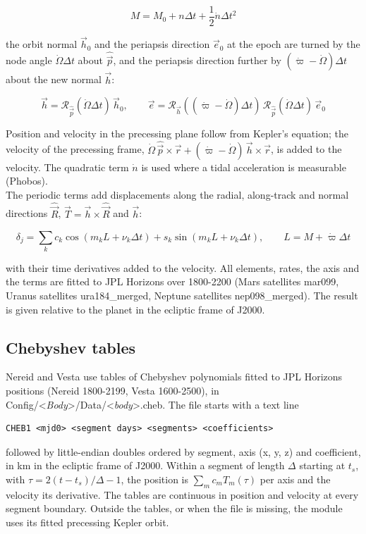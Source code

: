 \documentclass[Orbiter Technical Reference.tex]{subfiles}
\begin{document}
\begin{sloppypar}
\[ M = M_{0} + n \Delta t + \frac{1}{2} \dot{n} \Delta t^{2} \]

\noindent
the orbit normal $\vec{h}_{0}$ and the periapsis direction $\vec{e}_{0}$ at the epoch are turned by the node angle $\dot{\Omega} \Delta t$ about $\hat{\vec{p}}$, and the periapsis direction further by $(\dot{\varpi} - \dot{\Omega}) \Delta t$ about the new normal $\vec{h}$:

\[ \vec{h} = \mathcal{R}_{\hat{\vec{p}}}(\dot{\Omega}\Delta t)\, \vec{h}_{0}, \qquad \vec{e} = \mathcal{R}_{\vec{h}}((\dot{\varpi} - \dot{\Omega})\Delta t)\, \mathcal{R}_{\hat{\vec{p}}}(\dot{\Omega}\Delta t)\, \vec{e}_{0} \]

\noindent
Position and velocity in the precessing plane follow from Kepler's equation; the velocity of the precessing frame, $\dot{\Omega}\, \hat{\vec{p}} \times \vec{r} + (\dot{\varpi} - \dot{\Omega})\, \vec{h} \times \vec{r}$, is added to the velocity. The quadratic term $\dot{n}$ is used where a tidal acceleration is measurable (Phobos).\\
The periodic terms add displacements along the radial, along-track and normal directions $\hat{\vec{R}}$, $\hat{\vec{T}} = \vec{h} \times \hat{\vec{R}}$ and $\vec{h}$:

\[ \delta_{j} = \sum_{k} c_{k} \cos(m_{k} L + \nu_{k} \Delta t) + s_{k} \sin(m_{k} L + \nu_{k} \Delta t), \qquad L = M + \dot{\varpi} \Delta t \]

\noindent
with their time derivatives added to the velocity. All elements, rates, the axis and the terms are fitted to JPL Horizons over 1800-2200 (Mars satellites mar099, Uranus satellites ura184\_merged, Neptune satellites nep098\_merged). The result is given relative to the planet in the ecliptic frame of J2000.


\subsection{Chebyshev tables}
Nereid and Vesta use tables of Chebyshev polynomials fitted to JPL Horizons positions (Nereid 1800-2199, Vesta 1600-2500), in Config/<\textit{Body}>/Data/<\textit{body}>.cheb. The file starts with a text line

\begin{lstlisting}[language=OSFS]
CHEB1 <mjd0> <segment days> <segments> <coefficients>
\end{lstlisting}

\noindent
followed by little-endian doubles ordered by segment, axis (x, y, z) and coefficient, in km in the ecliptic frame of J2000. Within a segment of length $\Delta$ starting at $t_{s}$, with $\tau = 2(t - t_{s})/\Delta - 1$, the position is $\sum_{m} c_{m} T_{m}(\tau)$ per axis and the velocity its derivative. The tables are continuous in position and velocity at every segment boundary. Outside the tables, or when the file is missing, the module uses its fitted precessing Kepler orbit.



\end{sloppypar}
\end{document}
